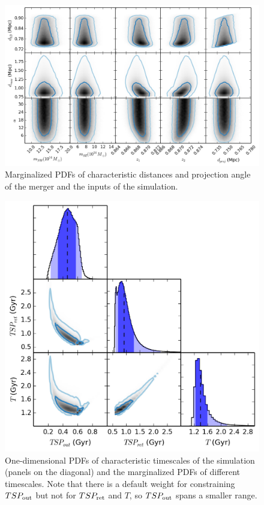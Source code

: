 \documentclass[letterpaper,useAMS,usenatbib]{mn2e}
\begin{document}
\begin{figure}
\begin{minipage}{180mm}
	\begin{center}
	\includegraphics[width=0.7\linewidth]{TwoMnWBSG_geoVSinputs.png}
	\caption{Marginalized PDFs of characteristic distances and projection
		angle of the merger and the inputs of the simulation.}
	\end{center}
	\end{minipage}
\end{figure}
\begin{figure}
\begin{minipage}{180mm}
	\begin{center}
	\includegraphics[width=0.5\linewidth]{TwoMnWBSG_tri_time.png}
	\caption{One-dimensional PDFs of characteristic timescales of the simulation
(panels on the diagonal) and the marginalized PDFs of different
timescales. Note that there is a default weight for constraining $TSP_{\rm out}$ but
not for $TSP_{\rm ret}$ and $T$, so $TSP_{\rm out}$ spans a smaller range.}
	\end{center}
\end{minipage}
\end{figure}
\end{document}
